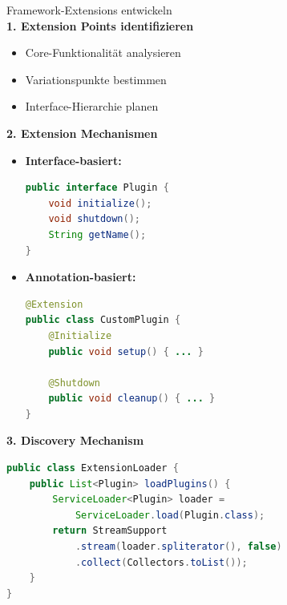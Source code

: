 \begin{KR}{Framework-Extensions entwickeln}\\
\textbf{1. Extension Points identifizieren}
\begin{itemize}
    \item Core-Funktionalität analysieren
    \item Variationspunkte bestimmen
    \item Interface-Hierarchie planen
\end{itemize}

\textbf{2. Extension Mechanismen}
\begin{itemize}
    \item \textbf{Interface-basiert:}
    \begin{lstlisting}[language=Java, style=basesmol]
public interface Plugin {
    void initialize();
    void shutdown();
    String getName();
}
    \end{lstlisting}
    
    \item \textbf{Annotation-basiert:}
    \begin{lstlisting}[language=Java, style=basesmol]
@Extension
public class CustomPlugin {
    @Initialize
    public void setup() { ... }
    
    @Shutdown
    public void cleanup() { ... }
}
    \end{lstlisting}
\end{itemize}

\textbf{3. Discovery Mechanism}
\begin{lstlisting}[language=Java, style=basesmol]
public class ExtensionLoader {
    public List<Plugin> loadPlugins() {
        ServiceLoader<Plugin> loader = 
            ServiceLoader.load(Plugin.class);
        return StreamSupport
            .stream(loader.spliterator(), false)
            .collect(Collectors.toList());
    }
}
\end{lstlisting}
\end{KR}

